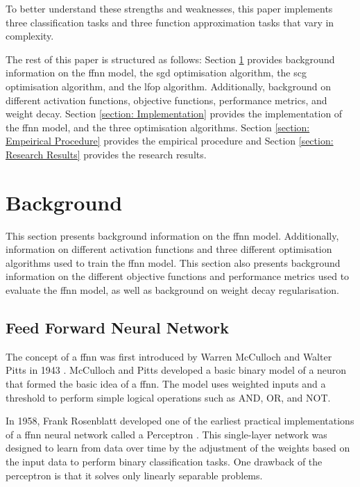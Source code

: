 \documentclass[10pt, conference]{IEEEtran}
\begin{document}
To better understand these strengths and weaknesses, this paper implements three classification tasks and three
function approximation tasks that vary in complexity.

The rest of this paper is structured as follows: Section \ref{section: Background} provides background
information on the \acrshort{ffnn} model, the \acrshort{sgd} optimisation algorithm, the \acrshort{scg}
optimisation algorithm, and the \acrshort{lfop} algorithm. Additionally, background on different activation
functions, objective functions, performance metrics, and weight decay. Section \ref{section: Implementation}
provides the implementation of the \acrshort{ffnn} model, and the three optimisation algorithms.
Section \ref{section: Empeirical Procedure} provides the empirical procedure and Section
\ref{section: Research Results} provides the research results.

\section{Background} \label{section: Background}

This section presents background information on the \acrshort{ffnn} model. Additionally, information on different
activation functions and three different optimisation algorithms used to train the \acrshort{ffnn} model. This
section also presents background information on the different objective functions and performance metrics used
to evaluate the \acrshort{ffnn} model, as well as background on weight decay regularisation.

\subsection{Feed Forward Neural Network} \label{section: FFNN_background}

The concept of a \acrshort{ffnn} was first introduced by Warren McCulloch and Walter Pitts in 1943 \cite{FFNN_ref}.
McCulloch and Pitts developed a basic binary model of a neuron that formed the basic idea of a \acrshort{ffnn}. The
model uses weighted inputs and a threshold to perform simple logical operations such as AND, OR, and NOT.

In 1958, Frank Rosenblatt developed one of the earliest practical implementations of a \acrshort{ffnn} neural network
called a Perceptron \cite{Perceptron_ref}. This single-layer network was designed to learn from data over time by the
adjustment of the weights based on the input data to perform binary classification tasks. One drawback of the perceptron
is that it solves only linearly separable problems.
\end{document}
